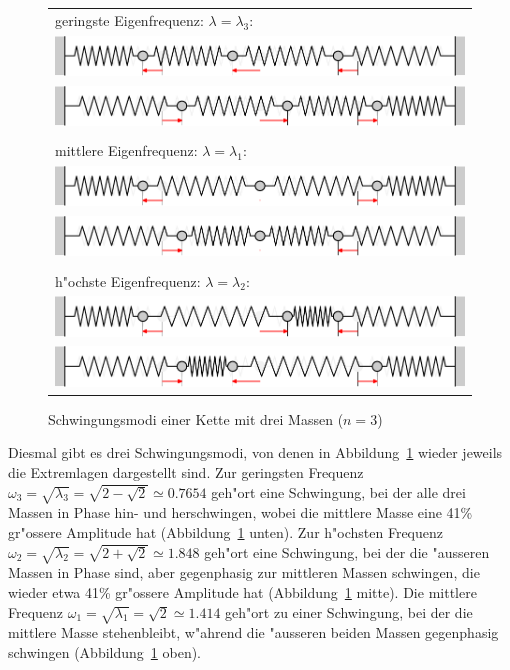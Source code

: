 \begin{figure}
\begin{center}
\begin{tabular}{l}
geringste Eigenfrequenz: $\lambda=\lambda_3$:\\
\includegraphics[width=\hsize]{images/e-8}\\
\includegraphics[width=\hsize]{images/e-9}\\
\\
mittlere Eigenfrequenz: $\lambda=\lambda_1$:\\
\includegraphics[width=\hsize]{images/e-6}\\
\includegraphics[width=\hsize]{images/e-7}\\
\\
h"ochste Eigenfrequenz: $\lambda=\lambda_2$:\\
\includegraphics[width=\hsize]{images/e-10}\\
\includegraphics[width=\hsize]{images/e-11}
\end{tabular}
\end{center}
\caption{Schwingungsmodi einer Kette mit drei Massen ($n=3$)\label{n3modi}}
\end{figure}%
Diesmal gibt es drei Schwingungsmodi, von denen in Abbildung~\ref{n3modi}
wieder jeweils die Extremlagen dargestellt sind. Zur geringsten Frequenz
$\omega_3=\sqrt{\lambda_3}=\sqrt{2-\sqrt{2}}\simeq 0.7654$
geh"ort eine Schwingung, bei der alle drei Massen in Phase
hin- und herschwingen, wobei die mittlere Masse eine 41\% 
gr"ossere Amplitude hat (Abbildung~\ref{n3modi} unten).
Zur h"ochsten Frequenz
$\omega_2=\sqrt{\lambda_2}=\sqrt{2+\sqrt{2}}\simeq 1.848$
geh"ort eine Schwingung, bei der die "ausseren Massen in Phase sind,
aber gegenphasig zur mittleren Massen schwingen, die wieder etwa
41\% gr"ossere Amplitude hat (Abbildung~\ref{n3modi} mitte).
Die mittlere Frequenz $\omega_1=\sqrt{\lambda_1}=\sqrt{2}\simeq 1.414$
geh"ort zu einer Schwingung, bei der die mittlere Masse stehenbleibt,
w"ahrend die "ausseren beiden Massen gegenphasig schwingen (Abbildung~\ref{n3modi} oben).

